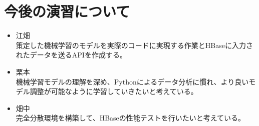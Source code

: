 \documentclass{scrartcl}
\begin{document}
\section{今後の演習について}
\label{sec:orgf289936}
\begin{itemize}
\item 江畑\\
策定した機械学習のモデルを実際のコードに実現する作業とHBaseに入力されたデータを送るAPIを作成する。\\
\item 栗本\\
機械学習モデルの理解を深め、Pythonによるデータ分析に慣れ、より良いモデル調整が可能なように学習していきたいと考えている。\\
\item 畑中\\
完全分散環境を構築して、HBaseの性能テストを行いたいと考えている。\\
\end{itemize}
\end{document}
